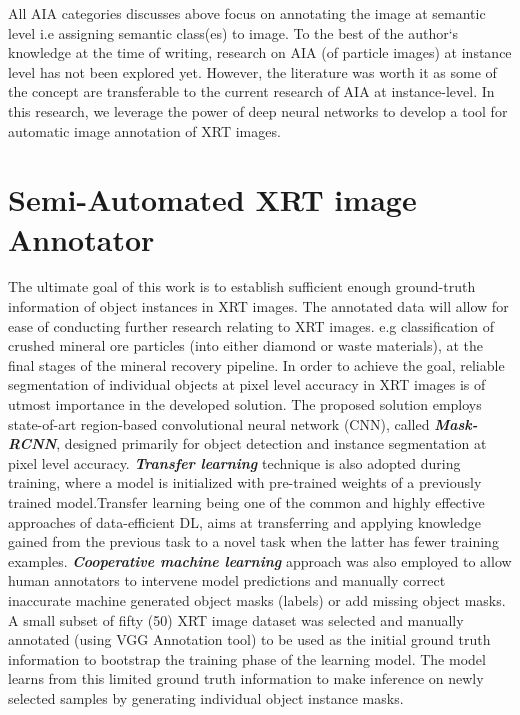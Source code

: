 \documentclass[conference]{IEEEtran}
\begin{document}
		All AIA categories discusses above focus on annotating the image at semantic level i.e
assigning semantic class(es) to image. To the best of the author‘s knowledge at the time
of writing, research on AIA (of particle images) at instance level has not been explored yet. However, the
literature was worth it as some of the concept are transferable to the current research of
AIA at instance-level. In this research, we leverage the power of deep neural networks to
develop a tool for automatic image annotation of XRT images.
	
	

	\section{Semi-Automated XRT image Annotator}
	
		The ultimate goal of this work is to establish sufficient enough ground-truth
information of object instances in XRT images. The annotated data will allow for ease of
conducting further research relating to XRT images. e.g classification of crushed mineral
ore particles (into either diamond or waste materials), at the final stages of the mineral
recovery pipeline. In order to achieve the goal, reliable segmentation of individual objects at pixel level accuracy in XRT images is of utmost importance in the developed solution.
The proposed solution employs state-of-art region-based convolutional neural network
(CNN), called \textbf{\textit{Mask-RCNN}}, designed primarily for object detection and instance segmentation at pixel level accuracy. \textbf{\textit{Transfer learning}} technique is also adopted during training, where a model is initialized with pre-trained weights of a previously trained model.Transfer learning being one of the common and highly effective approaches of data-efficient DL, aims at transferring and applying knowledge gained from the previous task to a novel task when the latter has fewer training examples. \textit{\textbf{Cooperative machine learning}} approach was also employed to allow human annotators to intervene model predictions and manually correct inaccurate machine generated object masks (labels) or add missing object masks.\\
		
		
		A small subset of fifty (50) XRT image dataset was selected and manually annotated (using VGG Annotation tool) to be used as the initial ground truth information to bootstrap the training phase of the learning model. The model learns from this limited ground truth information to make inference on newly selected samples by generating individual object instance masks. 
			
\end{document}
